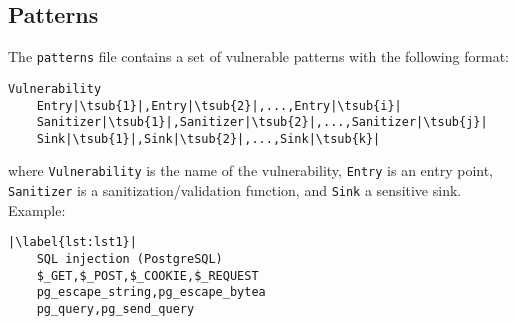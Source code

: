 \subsection*{Patterns}
\label{sec:expr.patterns}

The \verb|patterns| file contains a set of vulnerable patterns with the
following format:

\begin{lstlisting}[label={lst:pat.tmpl},
        caption={Vulnerable pattern template}]
    Vulnerability
    Entry|\tsub{1}|,Entry|\tsub{2}|,...,Entry|\tsub{i}|
    Sanitizer|\tsub{1}|,Sanitizer|\tsub{2}|,...,Sanitizer|\tsub{j}|
    Sink|\tsub{1}|,Sink|\tsub{2}|,...,Sink|\tsub{k}|
\end{lstlisting}

where \verb|Vulnerability| is the name of the vulnerability, \verb|Entry| is an
entry point, \verb|Sanitizer| is a sanitization/validation function, and
\verb|Sink| a sensitive sink. Example:

\begin{lstlisting}[label={lst:pat.ex},
        caption={SQL Injection pattern, specific to PostgreSQL}]
    |\label{lst:lst1}|
    SQL injection (PostgreSQL)
    $_GET,$_POST,$_COOKIE,$_REQUEST
    pg_escape_string,pg_escape_bytea
    pg_query,pg_send_query
\end{lstlisting}
